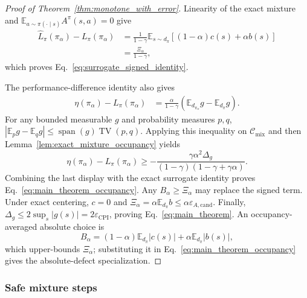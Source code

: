 \documentclass{article}
\theoremstyle{plain}
\theoremstyle{definition}
\theoremstyle{remark}
\newcommand{\E}{\mathbb{E}}
\begin{document}
\begin{proof}[Proof of Theorem~\ref{thm:monotone_with_error}]
Linearity of the exact mixture and
$\E_{a\sim\pi(\cdot\mid s)}A^\pi(s,a)=0$ give
\begin{align*}
\widehat L_\pi(\pi_\alpha)-L_\pi(\pi_\alpha)
&=\frac{1}{1-\gamma}\E_{s\sim d_\pi}
\left[(1-\alpha)c(s)+\alpha b(s)\right]\\
&=\frac{\Xi_\alpha}{1-\gamma},
\end{align*}
which proves Eq.~\eqref{eq:surrogate_signed_identity}.

The performance-difference identity also gives
\begin{align*}
\eta(\pi_\alpha)-L_\pi(\pi_\alpha)
&=\frac{\alpha}{1-\gamma}
\left(\E_{d_{\pi_\alpha}}g-\E_{d_\pi}g\right).
\end{align*}
For any bounded measurable $g$ and probability measures $p,q$,
$|\E_p g-\E_q g|\le\operatorname{span}(g)\operatorname{TV}(p,q)$.
Applying this inequality on $\mathcal C_{\mathrm{mix}}$ and then
Lemma~\ref{lem:exact_mixture_occupancy} yields
\[
\eta(\pi_\alpha)-L_\pi(\pi_\alpha)
\ge-
\frac{\gamma\alpha^2\Delta_g}
{(1-\gamma)(1-\gamma+\gamma\alpha)}.
\]
Combining the last display with the exact surrogate identity proves
Eq.~\eqref{eq:main_theorem_occupancy}. Any $B_\alpha\ge\Xi_\alpha$ may replace
the signed term. Under exact centering, $c=0$ and
$\Xi_\alpha=\alpha\E_{d_\pi}b\le
\alpha\varepsilon_{A,\mathrm{cand}}$. Finally,
$\Delta_g\le2\sup_s|g(s)|=2\varepsilon_{\mathrm{CPI}}$, proving
Eq.~\eqref{eq:main_theorem}.
An occupancy-averaged absolute choice is
\begin{equation}
B_\alpha
=(1-\alpha)\E_{d_\pi}|c(s)|
+\alpha\E_{d_\pi}|b(s)|,
\label{eq:Balpha_abs}
\end{equation}
which upper-bounds $\Xi_\alpha$; substituting it in
Eq.~\eqref{eq:main_theorem_occupancy} gives the absolute-defect specialization.
\end{proof}

\subsubsection{Safe mixture steps}
\label{app:safe_step_statement}
\end{document}
